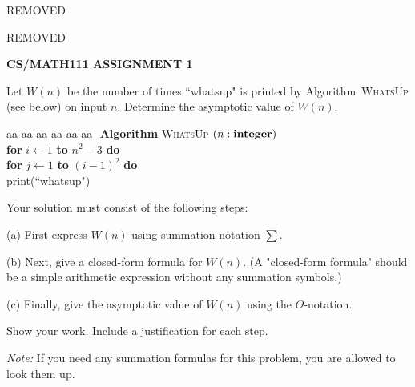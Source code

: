 \documentclass{article}
\begin{document}
\centerline{REMOVED}
\centerline{REMOVED}
\centerline{\large \bf CS/MATH111 ASSIGNMENT 1}

\vskip 0.1in


\vskip 0.2in

\large
\begin{problem}
Let $W(n)$ be the number of
times ``whatsup" is printed by Algorithm~\textsc{WhatsUp} (see below) on input $n$.
Determine the asymptotic value of $W(n)$.


\begin{tabbing}
aa \= aa \= aa \= aa \= aa \= aa \= \kill
\textbf{Algorithm} \textsc{WhatsUp} $(n: \mbox{\bf integer})$ \\
      \> \textbf{for} $i \leftarrow 1$ \textbf{to} $n^2-3$
                         \textbf{do} \\
      \> \> \textbf{for} $j \leftarrow 1$ \textbf{to} $(i-1)^2$ \textbf{do} \\
      \> \> \> print(``whatsup")
\end{tabbing}

Your solution must consist of the following steps:
%
\begin{description}
\item{(a)} First express $W(n)$ using summation notation $\sum$.
\item{(b)} Next, give a closed-form formula for $W(n)$. (A "closed-form formula"  
			should be a simple arithmetic expression without 
			any summation symbols.)
\item{(c)}  Finally, give the asymptotic value of $W(n)$ using the $\Theta$-notation. 
\end{description}
%
Show your work. Include a justification for each step. 

\smallskip
\noindent
\emph{Note:} If you need any summation formulas for this problem, you are allowed to
look them up.
\end{problem}
\end{document}

